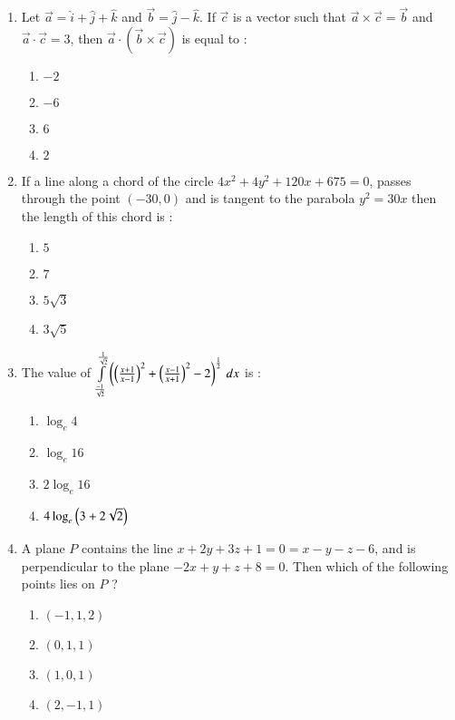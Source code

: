 \documentclass[journal,12pt,twocolumn]{IEEEtran}
\theoremstyle{remark}
\begin{document}
\begin{enumerate}
    \item Let $\vec{a}=\hat{i}+\hat{j}+\hat{k}$ and $\vec{b}=\hat{j}-\hat{k}$. If $\vec{c}$ is a vector such that $\vec{a}\times\vec{c}=\vec{b}$ and $\vec{a}\cdot\vec{c}=3$, then $\vec{a}\cdot(\vec{b}\times\vec{c})$ is equal to :
        \begin{enumerate}
            \item $-2$
            \item $-6$
            \item $6$
            \item $2$
        \end{enumerate}

    \item If a line along a chord of the circle $4x^2+4y^2+120x+675=0$, passes through the point $(-30, 0)$ and is tangent to the parabola $y^2 = 30x$ then the length of this chord is :
        \begin{enumerate}
            \item $5$
            \item $7$
            \item $5\sqrt{3}$
            \item $3\sqrt{5}$
        \end{enumerate}

    \item The value of $\int\limits_{\frac{-1}{\sqrt{2}}}^{\frac{1}{\sqrt{2}}}\left(\left(\frac{x+1}{x-1}\right)^2+\left(\frac{x-1}{x+1}\right)^2-2\right)^{\frac{1}{2}}\,dx$ is :
        \begin{enumerate}
            \item $\log_e4$
            \item $\log_e16$
            \item $2\log_e16$
            \item $4\log_e\left(3+2\sqrt{2}\right)$
        \end{enumerate}

    \item A plane $P$ contains the line $x+2y+3z+1=0=x-y-z-6$, and is perpendicular to the plane $-2x+y+z+8=0$. Then which of the following points lies on $P$ ?
        \begin{enumerate}
            \item $(-1, 1, 2)$
            \item $(0, 1, 1)$
            \item $(1, 0, 1)$
            \item $(2, -1, 1)$
        \end{enumerate}

\end{enumerate}
\end{document}
